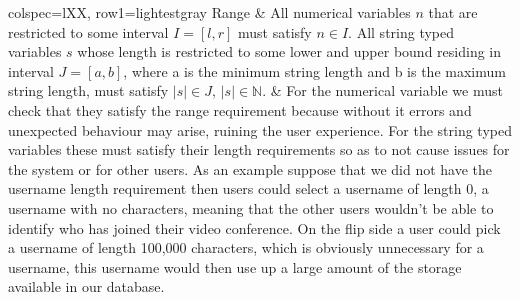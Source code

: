 \begin{longtblr}[
  caption={Data validation rules.}
]{colspec={lXX}, row{1}={lightestgray}}
Range & {All numerical variables $n$ that are restricted to some
interval $I = [l, r]$ must satisfy $n \in I$. All string typed variables $s$
whose length is restricted to some lower and upper bound residing in
interval $J = [a, b]$, where a is the minimum string length and b is 
the maximum string length,
must satisfy 
$\left|s\right| \in J, \, \left|s\right| \in \mathbb{N} $}. & {For 
the numerical variable we must check 
that they satisfy the range requirement because without it errors and
unexpected behaviour may arise, ruining the user experience. For the 
string typed variables these must satisfy their length requirements so as
to not cause issues for the system or for other users. As an example suppose
that we did not have the username length requirement then users could select 
a username of length 0, a username with no characters, meaning that the other 
users wouldn't be able to identify who has joined their video conference. On the
flip side a user could pick a username of length 100,000 characters, which is
obviously unnecessary for a username, this username would then use up a large 
amount of the storage available in our database.}\\

\end{longtblr}

